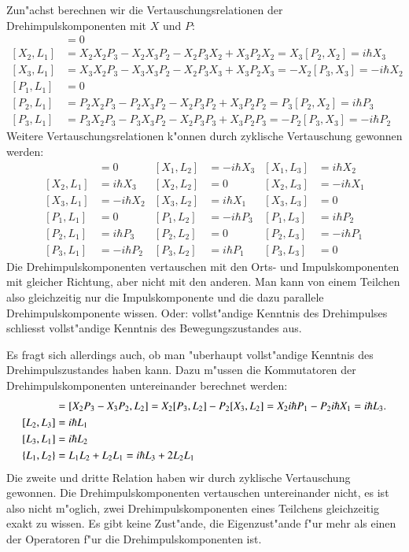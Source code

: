 Zun"achst berechnen wir die Vertauschungsrelationen der
Drehimpulskomponenten mit $X$ und $P$:
\begin{align*}
[X_1,L_1]&=0\\
[X_2,L_1]
&=
X_2X_2P_3-X_2X_3P_2-X_2P_3X_2+X_3P_2X_2
=X_3[P_2,X_2]
=i\hbar X_3
\\
[X_3,L_1]
&=
X_3X_2P_3-X_3X_3P_2-X_2P_3X_3+X_3P_2X_3
=
-X_2[P_3,X_3]
=
-i\hbar X_2
\\
[P_1,L_1]&=0\\
[P_2,L_1]
&=
P_2X_2P_3 - P_2X_3P_2 - X_2P_3P_2 + X_3P_2P_2
=
P_3[P_2,X_2]
=
i\hbar P_3
\\
[P_3,L_1]
&=
P_3X_2P_3 - P_3X_3P_2 - X_2P_3P_3 + X_3P_2P_3
=
-P_2[P_3,X_3]=-i\hbar P_2
\end{align*}
Weitere Vertauschungsrelationen k"onnen durch zyklische Vertauschung
gewonnen werden:
\begin{align*}
[X_1,L_1] &= 0          & [X_1,L_2] &=-i\hbar X_3 & [X_1,L_3] &= i\hbar X_2\\
[X_2,L_1] &= i\hbar X_3 & [X_2,L_2] &= 0          & [X_2,L_3] &=-i\hbar X_1\\
[X_3,L_1] &=-i\hbar X_2 & [X_3,L_2] &= i\hbar X_1 & [X_3,L_3] &= 0         \\
[P_1,L_1] &= 0          & [P_1,L_2] &=-i\hbar P_3 & [P_1,L_3] &= i\hbar P_2\\
[P_2,L_1] &= i\hbar P_3 & [P_2,L_2] &= 0          & [P_2,L_3] &=-i\hbar P_1\\
[P_3,L_1] &=-i\hbar P_2 & [P_3,L_2] &= i\hbar P_1 & [P_3,L_3] &= 0
\end{align*}
Die Drehimpulskomponenten vertauschen mit den Orts- und Impulskomponenten
mit gleicher Richtung, aber nicht mit den anderen.
Man kann von einem Teilchen also gleichzeitig nur die Impulskomponente
und die dazu parallele Drehimpulskomponente wissen. 
Oder: vollst"andige Kenntnis des Drehimpulses schliesst vollst"andige
Kenntnis des Bewegungszustandes aus.

Es fragt sich allerdings auch, ob man "uberhaupt vollst"andige Kenntnis
des Drehimpulszustandes haben kann.
Dazu m"ussen die Kommutatoren der Drehimpulskomponenten untereinander
berechnet werden:
\begin{align}
[L_1,L_2]
&=
[X_2P_3-X_3P_2,L_2]
=
X_2[P_3,L_2]-P_2[X_3,L_2]
=
X_2i\hbar P_1-P_2i\hbar X_1
=
i\hbar L_3.
\label{drehimpulskommutator}
\\
[L_2,L_3]&=i\hbar L_1
\notag
\\
[L_3,L_1]&=i\hbar L_2
\notag
\\
\{L_1,L_2\}
&=
L_1L_2+L_2L_1=i\hbar L_3+2L_2L_1
\label{drehimpulsantikommutator}
\end{align}
Die zweite und dritte Relation haben wir durch zyklische Vertauschung
gewonnen.
Die Drehimpulskomponenten vertauschen untereinander nicht, es ist also
nicht m"oglich, zwei Drehimpulskomponenten eines Teilchens
gleichzeitig exakt zu wissen.
Es gibt keine Zust"ande, die Eigenzust"ande f"ur mehr als einen
der Operatoren f"ur die Drehimpulskomponenten ist.

